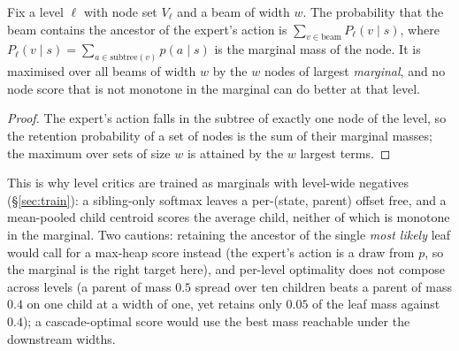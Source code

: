 \begin{proposition}\label{prop:marginal}
Fix a level $\ell$ with node set $V_\ell$ and a beam of width $w$. The probability that the beam contains the ancestor of the expert's action is
$\sum_{v\in\text{beam}}P_\ell(v\mid s)$, where $P_\ell(v\mid s)=\sum_{a\in\mathrm{subtree}(v)}p(a\mid s)$ is the marginal mass of the node. It is maximised over all beams of width $w$ by the $w$ nodes of largest \emph{marginal}, and no node score that is not monotone in the marginal can do better at that level.
\end{proposition}
\begin{proof}
The expert's action falls in the subtree of exactly one node of the level, so the retention probability of a set of nodes is the sum of their marginal masses; the maximum over sets of size $w$ is attained by the $w$ largest terms.\qedhere
\end{proof}
\noindent This is why level critics are trained as marginals with level-wide negatives (\S\ref{sec:train}): a sibling-only softmax leaves a per-(state, parent) offset free, and a mean-pooled child centroid scores the average child, neither of which is monotone in the marginal. Two cautions: retaining the ancestor of the single \emph{most likely} leaf would call for a max-heap score instead (the expert's action is a draw from $p$, so the marginal is the right target here), and per-level optimality does not compose across levels (a parent of mass $0.5$ spread over ten children beats a parent of mass $0.4$ on one child at a width of one, yet retains only $0.05$ of the leaf mass against $0.4$); a cascade-optimal score would use the best mass reachable under the downstream widths.

